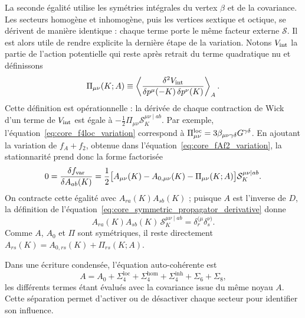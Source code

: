 La seconde égalité utilise les symétries intégrales du vertex $\beta$ et de
la covariance. Les secteurs homogène et inhomogène, puis les vertices
sextique et octique, se dérivent de manière identique : chaque terme porte le
même facteur externe $\mathcal S$. Il est alors utile de rendre explicite la
dernière étape de la variation. Notons $V_{\rm int}$ la partie de l'action
potentielle qui reste après retrait du terme quadratique nu et définissons
\begin{equation}
\Pi_{\mu\nu}(K;A)
\equiv
\left\langle
\frac{\delta^2 V_{\rm int}}
{\delta p^\mu(-K)\,\delta p^\nu(K)}
\right\rangle_A .
\label{eq:core_scha_average_hessian}
\end{equation}
Cette définition est opérationnelle : la dérivée de chaque contraction de
Wick d'un terme de $V_{\rm int}$ est égale à $-\tfrac12\Pi_{\mu\nu}\mathcal
S_K^{\mu\nu\mid ab}$. Par exemple, l'équation~\eqref{eq:core_f4loc_variation}
correspond à $\Pi^{\rm loc}_{\mu\nu}=3\beta_{\mu\nu\gamma\delta}
G^{\gamma\delta}$. En ajoutant la variation de $f_A+f_2$, obtenue dans
l'équation~\eqref{eq:core_fAf2_variation}, la stationnarité prend donc la forme
factorisée
\begin{equation}
0=\frac{\delta f_{\rm var}}{\delta A_{ab}(K)}
=\frac12
\big[A_{\mu\nu}(K)-A_{0,\mu\nu}(K)-\Pi_{\mu\nu}(K;A)\big]
\mathcal S_K^{\mu\nu\mid ab}.
\label{eq:core_scha_factorized_stationarity}
\end{equation}
On contracte cette
égalité avec $A_{ra}(K)A_{sb}(K)$ ; puisque $A$ est l'inverse de $D$, la
définition de l'équation~\eqref{eq:core_symmetric_propagator_derivative} donne
\begin{equation}
A_{ra}(K)A_{sb}(K)\,
\mathcal S_K^{\mu\nu\mid ab}
=\delta_r^{(\mu}\delta_s^{\nu)}.
\label{eq:core_scha_external_leg_cancellation}
\end{equation}
Comme $A$, $A_0$ et $\Pi$ sont symétriques, il reste directement
$A_{rs}(K)=A_{0,rs}(K)+\Pi_{rs}(K;A)$.

Dans une écriture condensée, l'équation auto-cohérente est
\begin{equation}
A=A_0+\Sigma_{4}^{\mathrm{loc}}
+\Sigma_{4}^{\mathrm{hom}}
+\Sigma_{4}^{\mathrm{inh}}
+\Sigma_{6}+\Sigma_{8},
\label{eq:ann_scha_compacte}
\end{equation}
les différents termes étant évalués avec la covariance issue du même noyau
$A$. Cette séparation permet d'activer ou de désactiver chaque secteur pour
identifier son influence.

